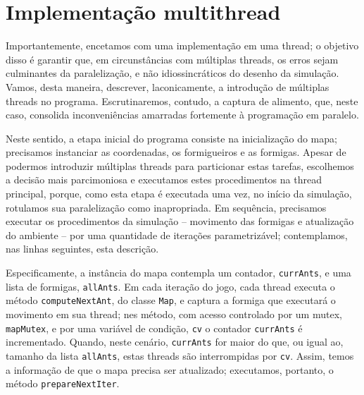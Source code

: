 \documentclass[12pt]{article}
\theoremstyle{definition}
\begin{document}
\section{Implementação multithread} 

Importantemente, encetamos com uma implementação em uma thread; o objetivo disso é garantir que, em circunstâncias com múltiplas threads, os erros sejam culminantes da paralelização, e não idiossincráticos do desenho da simulação. Vamos, desta maneira, descrever, laconicamente, a introdução de múltiplas threads no programa. Escrutinaremos, contudo, a captura de alimento, que, neste caso, consolida inconveniências amarradas fortemente à programação em paralelo. 

Neste sentido, a etapa inicial do programa consiste na inicialização do mapa; precisamos instanciar as coordenadas, os formigueiros e as formigas. Apesar de podermos introduzir múltiplas threads para particionar estas tarefas, escolhemos a decisão mais parcimoniosa e executamos estes procedimentos na thread principal, porque, como esta etapa é executada uma vez, no início da simulação, rotulamos sua paralelização como inapropriada. Em sequência, precisamos executar os procedimentos da simulação -- movimento das formigas e atualização do ambiente -- por uma quantidade de iterações parametrizável; contemplamos, nas linhas seguintes, esta descrição. 

Especificamente, a instância do mapa contempla um contador, \texttt{currAnts}, e uma lista de formigas, \texttt{allAnts}. Em cada iteração do jogo, cada thread executa o método \texttt{computeNextAnt}, do classe \texttt{Map}, e captura a formiga que executará o movimento em sua thread; nes método, com acesso controlado por um mutex, \texttt{mapMutex}, e por uma variável de condição, \texttt{cv} o contador \texttt{currAnts} é incrementado. Quando, neste cenário, \texttt{currAnts} for maior do que, ou igual ao, tamanho da lista \texttt{allAnts}, estas threads são interrompidas por \texttt{cv}. Assim, temos a informação de que o mapa precisa ser atualizado; executamos, portanto, o método \texttt{prepareNextIter}. 
\end{document}
